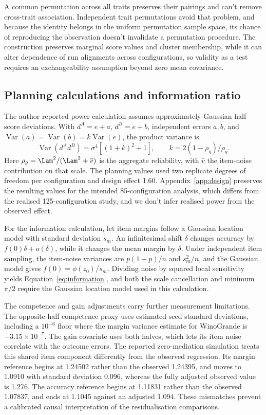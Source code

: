 A common permutation across all traits preserves their pairings and can't remove cross-trait association. Independent trait permutations avoid that problem, and because the identity belongs in the uniform permutation sample space, its chance of reproducing the observation doesn't invalidate a permutation procedure. The construction preserves marginal score values and cluster membership, while it can alter dependence of run alignments across configurations, so validity as a test requires an exchangeability assumption beyond zero mean covariance.

\subsection{Planning calculations and information ratio}
The author-reported power calculation assumes approximately Gaussian half-score deviations. With $d^A=e+a$, $d^B=e+b$, independent errors $a,b$, and $\operatorname{Var}(a)=\operatorname{Var}(b)=k\operatorname{Var}(e)$, the product variance is
\begin{equation}
\operatorname{Var}(d^Ad^B)=\sigma^4[(1+k)^2+1],\qquad
k=2(1-\rho_g)/\rho_g.
\end{equation}
Here $\rho_g=\Lam^2/(\Lam^2+\bar v)$ is the aggregate reliability, with $\bar v$ the item-noise contribution on that scale. The planning values used two replicate degrees of freedom per configuration and design effect 1.60. Appendix~\ref{app:design} preserves the resulting values for the intended 85-configuration analysis, which differs from the realised 125-configuration study, and we don't infer realised power from the observed effect.

For the information calculation, let item margins follow a Gaussian location model with standard deviation $s_m$. An infinitesimal shift $\delta$ changes accuracy by $f(0)\delta+o(\delta)$, while it changes the mean margin by $\delta$. Under independent item sampling, the item-noise variances are $p(1-p)/n$ and $s_m^2/n$, and the Gaussian model gives $f(0)=\phi(z_0)/s_m$. Dividing noise by squared local sensitivity yields Equation~\ref{eq:information}, and both the scale cancellation and minimum $\pi/2$ require the Gaussian location model used in this calculation.

The competence and gain adjustments carry further measurement limitations. The opposite-half competence proxy uses estimated seed standard deviations, including a $10^{-6}$ floor where the margin variance estimate for WinoGrande is $-3.15\times10^{-7}$. The gain covariate uses both halves, which lets its item noise correlate with the outcome errors. The reported zero-mediation simulation treats this shared item component differently from the observed regression. Its margin reference begins at 1.24502 rather than the observed 1.24395, and moves to 1.0910 with standard deviation 0.096, whereas the fully adjusted observed value is 1.276. The accuracy reference begins at 1.11831 rather than the observed 1.07837, and ends at 1.1045 against an adjusted 1.094. These mismatches prevent a calibrated causal interpretation of the residualisation comparisons. 